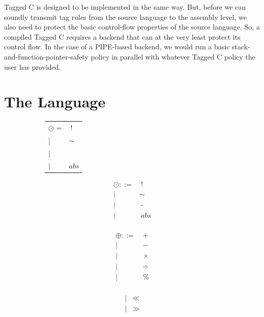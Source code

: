 \documentclass[acmsmall,review,anonymous]{acmart}\settopmatter{printfolios=true,printccs=false,printacmref=false}
\begin{document}
Tagged C is designed to be implemented in the same way. But, before we can soundly transmit
tag rules from the source language to the assembly level, we also need to protect the basic
control-flow properties of the source language. So, a compiled Tagged C requires a backend that
can at the very least protect its control flow. In the case of a PIPE-based backend, we would
run a basic stack-and-function-pointer-safety policy in parallel with whatever Tagged C policy
the user has provided.

\section{The Language}

\begin{figure}
  \begin{subfigure}[t]{0.3\textwidth}
    \begin{minipage}[t]{0.4\textwidth}
      \begin{tabular}{l l}
        \(\odot\) = & \(~!\) \\
        | &\(\sim\) \\
        | &\text{-} \\
        | &\(\mathit{abs}\) \\
      \end{tabular}
      \[\begin{aligned}
      \odot ::= & ~ ! \\
      | & \sim \\
      | & ~ \text{-} \\
      | & ~ \mathit{abs} \\
      \end{aligned}\]
    \end{minipage}
    \begin{minipage}[t]{0.3\textwidth}
      \[\begin{aligned}
      \oplus ::= & ~ + \\
      | & ~ - \\
      | & ~ \times \\
      | & ~ \div \\
      | & ~ \% \\
      \end{aligned}\]
    \end{minipage}
    \begin{minipage}[t]{0.25\textwidth}
      \[\begin{aligned}
      | & \ll \\
      | & \gg \\

\end{aligned}\]
\end{minipage}
\end{subfigure}
\end{figure}
\end{document}
